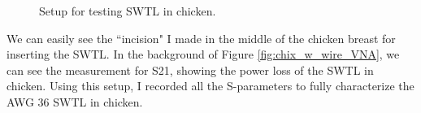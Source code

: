\documentclass[12pt,onecolumn,titlepage]{article}
\begin{document}
\begin{figure}[htbp]
	\centering
		\quad
		
		\quad
	\label{fig:SWTL_chicken}
	\caption{Setup for testing SWTL in chicken. }
\end{figure}


We can easily see the ``incision" I made in the middle of the chicken breast for inserting the SWTL. In the background of Figure \ref{fig:chix_w_wire_VNA}, we can see the measurement for S21, showing the power loss of the SWTL in chicken. Using this setup, I recorded all the S-parameters to fully characterize the AWG 36 SWTL in chicken.
\end{document}
